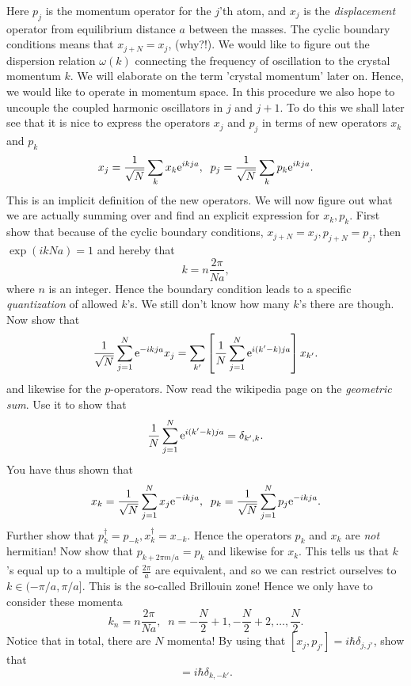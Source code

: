 \documentclass[10pt]{article}
\def\te{{\rm e}}
\begin{document}
Here $p_j$ is the momentum operator for the $j$'th atom, and $x_j$ is the \textit{displacement} operator from equilibrium distance $a$ between the masses. The cyclic boundary conditions means that $x_{j+N}=x_j$, (why?!). We would like to figure out the dispersion relation $\omega(k)$ connecting the frequency of oscillation to the crystal momentum $k$. We will elaborate on the term 'crystal momentum' later on. Hence, we would like to operate in momentum space. In this procedure we also hope to uncouple the coupled harmonic oscillators in $j$ and $j+1$. To do this we shall later see that it is nice to express the operators $x_j$ and $p_j$ in terms of new operators $x_k$ and $p_k$
\begin{equation}
x_j = \frac{1}{\sqrt{N}}\sum_k x_k \te^{ikja}, \; \;  p_j = \frac{1}{\sqrt{N}}\sum_k p_k\te^{ikja}. 
\label{eq.fourier_decomp_xjpj}
\end{equation}
This is an implicit definition of the new operators. We will now figure out what we are actually summing over and find an explicit expression for $x_k, p_k$. First show that because of the cyclic boundary conditions, $x_{j + N} = x_j, p_{j + N} = p_j$, then $\exp(ikNa) = 1$ and hereby that
\begin{equation}
k = n\frac{2\pi}{Na}, \nonumber
\end{equation}
where $n$ is an integer. Hence the boundary condition leads to a specific \textit{quantization} of allowed $k$'s. We still don't know how many $k$'s there are though. Now show that
\begin{equation}
\frac{1}{\sqrt{N}}\sum_{j = 1}^{N} \te^{-ikja} x_j = \sum_{k'} \left[\frac{1}{N}\sum_{j = 1}^{N} \te^{i(k' - k)ja}\right]x_{k'}. \nonumber
\end{equation}
and likewise for the $p$-operators. Now read the wikipedia page on the \textit{geometric sum}. Use it to show that
\begin{equation}
\frac{1}{N}\sum_{j = 1}^{N} \te^{i(k'-k)ja} = \delta_{k', k}. \nonumber
\end{equation}
You have thus shown that
\begin{equation}
x_k = \frac{1}{\sqrt{N}}\sum_{j=1}^N x_j\te^{-ikja}, \; \; p_k = \frac{1}{\sqrt{N}}\sum_{j=1}^N p_j\te^{-ikja}. 
\label{eq.fourier_decomp_xkpk}
\end{equation}
Further show that $p_k^\dagger = p_{-k}, x_k^\dagger = x_{-k}$. Hence the operators $p_k$ and $x_k$ are \textit{not} hermitian! Now show that $p_{k+2\pi m/a}=p_k$ and likewise for $x_k$. This tells us that $k$'s equal up to a multiple of $\frac{2\pi}{a}$ are equivalent, and so we can restrict ourselves to $k\in (-\pi/a, \pi/a]$.  This is the so-called Brillouin zone! Hence we only have to consider these momenta
\begin{equation}
k_n = n\frac{2\pi}{Na}, \; \; n = -\frac{N}{2}+1, -\frac{N}{2}+2, \dots, \frac{N}{2}. 
\end{equation}
Notice that in total, there are $N$ momenta! By using that $[x_j,p_{j'}]=i\hbar \delta_{j,j'}$, show that
\begin{equation}
[x_k,p_{k'}]=i\hbar \delta_{k,-k'}. 
\end{equation}
\end{document}
